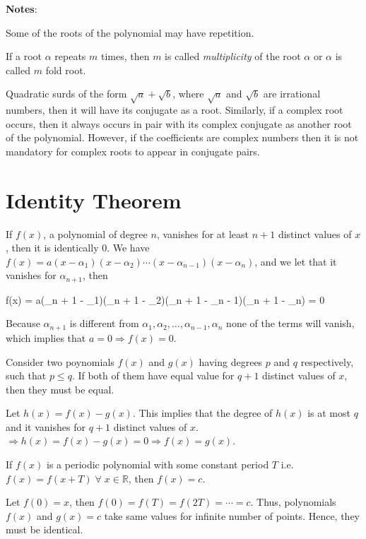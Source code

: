{\bf Notes}:
\startitemize[n]
\item Some of the roots of the polynomial may have repetition.
\item If a root $\alpha$ repeats $m$ times, then $m$ is called {\it multiplicity} of the root $\alpha$
  or $\alpha$ is called $m$ fold root.
\item Quadratic surds of the form $\sqrt{a} + \sqrt{b}$, where $\sqrt{a}$ and $\sqrt{b}$ are irrational
  numbers, then it will have its conjugate as a root. Similarly, if a complex root occurs, then it always
  occurs in pair with its complex conjugate as another root of the polynomial. However, if the coefficients
  are complex numbers then it is not mandatory for complex roots to appear in conjugate pairs.
\stopitemize

\section{Identity Theorem}
\starttheorem
  If $f(x)$, a polynomial of degree $n$, vanishes for at least $n + 1$ distinct values of $x$, then it is
  identically $0$.
\stoptheorem
\startproof
  We have $f(x) = a(x - \alpha_1)(x - \alpha_2)\cdots(x - \alpha_{n - 1})(x - \alpha_n)$, and we let that it
  vanishes for $\alpha_{n + 1}$, then

  \startformula f(x) = a(\alpha_{n + 1} - \alpha_1)(\alpha_{n + 1} - \alpha_2)\cdots(\alpha_{n + 1} -
    \alpha_{n - 1})(\alpha_{n + 1} - \alpha_n) = 0\stopformula

  Because $\alpha_{n + 1}$ is different from $\alpha_1, \alpha_2, \ldots, \alpha_{n - 1}, \alpha_n$ none of
  the terms will vanish, which implies that $a = 0 \Rightarrow f(x) = 0$.
\stopproof

\startcorollary
  Consider two poynomials $f(x)$ and $g(x)$ having degrees $p$ and $q$ respectively, such that $p\leq q$. If
  both of them have equal value for $q + 1$ distinct values of $x$, then they must be equal.
\stopcorollary

\startproof
  Let $h(x) = f(x) - g(x)$. This implies that the degree of $h(x)$ is at most $q$ and it vanishes for $q +
  1$ distinct values of $x$. $\Rightarrow h(x) = f(x) - g(x) = 0 \Rightarrow f(x) = g(x)$.
\stopproof

\startcorollary
  If $f(x)$ is a periodic polynomial with some constant period $T$ i.e. $f(x) = f(x +
  T)\;\forall\;x\in\mathbb{R}$, then $f(x) = c$.
\stopcorollary

\startproof
  Let $f(0) = x$, then $f(0) = f(T) = f(2T) = \cdots = c$. Thus, polynomials $f(x)$ and $g(x) = c$ take same
  values for infinite number of points. Hence, they must be identical.
\stopproof

